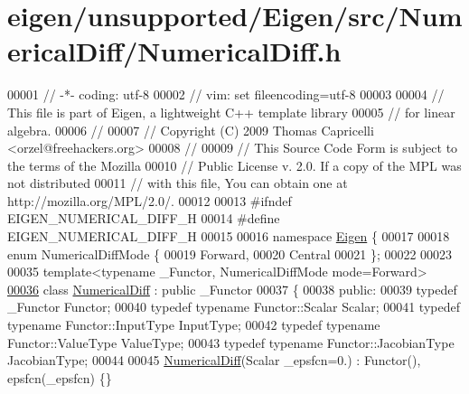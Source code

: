 \hypertarget{eigen_2unsupported_2_eigen_2src_2_numerical_diff_2_numerical_diff_8h_source}{}\section{eigen/unsupported/\+Eigen/src/\+Numerical\+Diff/\+Numerical\+Diff.h}
\label{eigen_2unsupported_2_eigen_2src_2_numerical_diff_2_numerical_diff_8h_source}

\begin{DoxyCode}
00001 \textcolor{comment}{// -*- coding: utf-8}
00002 \textcolor{comment}{// vim: set fileencoding=utf-8}
00003 
00004 \textcolor{comment}{// This file is part of Eigen, a lightweight C++ template library}
00005 \textcolor{comment}{// for linear algebra.}
00006 \textcolor{comment}{//}
00007 \textcolor{comment}{// Copyright (C) 2009 Thomas Capricelli <orzel@freehackers.org>}
00008 \textcolor{comment}{//}
00009 \textcolor{comment}{// This Source Code Form is subject to the terms of the Mozilla}
00010 \textcolor{comment}{// Public License v. 2.0. If a copy of the MPL was not distributed}
00011 \textcolor{comment}{// with this file, You can obtain one at http://mozilla.org/MPL/2.0/.}
00012 
00013 \textcolor{preprocessor}{#ifndef EIGEN\_NUMERICAL\_DIFF\_H}
00014 \textcolor{preprocessor}{#define EIGEN\_NUMERICAL\_DIFF\_H}
00015 
00016 \textcolor{keyword}{namespace }\hyperlink{namespace_eigen}{Eigen} \{ 
00017 
00018 \textcolor{keyword}{enum} NumericalDiffMode \{
00019     Forward,
00020     Central
00021 \};
00022 
00023 
00035 \textcolor{keyword}{template}<\textcolor{keyword}{typename} \_Functor, NumericalDiffMode mode=Forward>
\hyperlink{class_eigen_1_1_numerical_diff}{00036} \textcolor{keyword}{class }\hyperlink{class_eigen_1_1_numerical_diff}{NumericalDiff} : \textcolor{keyword}{public} \_Functor
00037 \{
00038 \textcolor{keyword}{public}:
00039     \textcolor{keyword}{typedef} \_Functor Functor;
00040     \textcolor{keyword}{typedef} \textcolor{keyword}{typename} Functor::Scalar Scalar;
00041     \textcolor{keyword}{typedef} \textcolor{keyword}{typename} Functor::InputType InputType;
00042     \textcolor{keyword}{typedef} \textcolor{keyword}{typename} Functor::ValueType ValueType;
00043     \textcolor{keyword}{typedef} \textcolor{keyword}{typename} Functor::JacobianType JacobianType;
00044 
00045     \hyperlink{class_eigen_1_1_numerical_diff}{NumericalDiff}(Scalar \_epsfcn=0.) : Functor(), epsfcn(\_epsfcn) \{\}

\end{DoxyCode}

